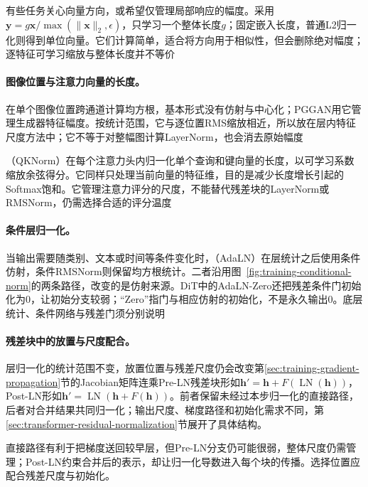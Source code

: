 有些任务关心向量方向，或希望仅管理局部响应的幅度。采用$\bm y=g\bm x/\max(\lVert\bm x\rVert_2,\epsilon)$，只学习一个整体长度$g$；固定嵌入长度，普通L2归一化则得到单位向量。它们计算简单，适合将方向用于相似性，但会删除绝对幅度；逐特征可学习缩放与整体长度并不等价

\paragraph{图像位置与注意力向量的长度。}

在单个图像位置跨通道计算均方根，基本形式没有仿射与中心化；PGGAN用它管理生成器特征幅度。按统计范围，它与逐位置RMS缩放相近，所以放在层内特征尺度方法中；它不等于对整幅图计算LayerNorm，也会消去原始幅度

（QKNorm）在每个注意力头内归一化单个查询和键向量的长度，以可学习系数缩放余弦得分。它同样只处理当前向量的特征维，目的是减少长度增长引起的Softmax饱和。它管理注意力评分的尺度，不能替代残差块的LayerNorm或RMSNorm，仍需选择合适的评分温度

\paragraph{条件层归一化。}

当输出需要随类别、文本或时间等条件变化时，（AdaLN）在层统计之后使用条件仿射，条件RMSNorm则保留均方根统计。二者沿用图~\ref{fig:training-conditional-norm}的两条路径，改变的是仿射来源。DiT中的AdaLN-Zero还把残差条件门初始化为0，让初始分支较弱；“Zero”指门与相应仿射的初始化，不是永久输出0。底层统计、条件网络与残差门须分别说明

\paragraph{残差块中的放置与尺度配合。}

层归一化的统计范围不变，放置位置与残差尺度仍会改变第\ref{sec:training-gradient-propagation}节的Jacobian矩阵连乘Pre-LN残差块形如$\bm h'=\bm h+F(\operatorname{LN}(\bm h))$，Post-LN形如$\bm h'=\operatorname{LN}(\bm h+F(\bm h))$。前者保留未经过本步归一化的直接路径，后者对合并结果共同归一化；输出尺度、梯度路径和初始化需求不同，第\ref{sec:transformer-residual-normalization}节展开了具体结构。

直接路径有利于把梯度送回较早层，但Pre-LN分支仍可能很弱，整体尺度仍需管理；Post-LN约束合并后的表示，却让归一化导数进入每个块的传播。选择位置应配合残差尺度与初始化。

